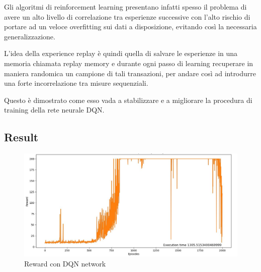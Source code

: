 Gli algoritmi di reinforcement learning presentano infatti spesso il problema di avere un alto livello di correlazione tra esperienze successive con l'alto rischio di portare ad un veloce overfitting sui dati a disposizione, evitando così la necessaria generalizzazione.

L’idea della experience replay è quindi quella di salvare le esperienze
in una memoria chiamata replay memory e durante ogni passo di learning recuperare in maniera randomica un campione di tali transazioni, per andare così ad introdurre una forte incorrelazione tra misure sequenziali.

Questo è dimostrato come esso vada a stabilizzare e a migliorare la procedura di training della rete neurale DQN.

\subsection{Result}
\begin{figure}[!h]
	\centering
	\includegraphics[width=\textwidth]{Immagini/DQN_Agent.JPG}
	\caption{Reward con DQN network}
	\label{fig:DQN_reward}
\end{figure}

\newpage